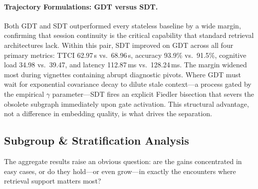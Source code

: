 \documentclass[10pt, onecolumn]{article}
\begin{document}
\paragraph{Trajectory Formulations: GDT versus SDT.}
Both GDT and SDT outperformed every stateless baseline by a wide margin, confirming that session continuity is the critical capability that standard retrieval architectures lack. Within this pair, SDT improved on GDT across all four primary metrics: TTCI 62.97\,s vs.\ 68.96\,s, accuracy 93.9\% vs.\ 91.5\%, cognitive load 34.98 vs.\ 39.47, and latency 112.87\,ms vs.\ 128.24\,ms. The margin widened most during vignettes containing abrupt diagnostic pivots. Where GDT must wait for exponential covariance decay to dilute stale context---a process gated by the empirical $\gamma$ parameter---SDT fires an explicit Fiedler bisection that severs the obsolete subgraph immediately upon gate activation. This structural advantage, not a difference in embedding quality, is what drives the separation.

\subsection{Subgroup \& Stratification Analysis}

The aggregate results raise an obvious question: are the gains concentrated in easy cases, or do they hold---or even grow---in exactly the encounters where retrieval support matters most?
\end{document}
